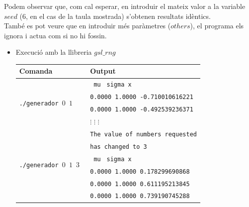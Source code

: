 \documentclass[a4paper, 11pt]{article}
\begin{document}
    Podem observar que, com cal esperar, en introduir el mateix valor a la variable $seed$ ($6$, en el cas de la taula mostrada) s'obtenen resultats idèntics.\\
    També es pot veure que en introduir més paràmetres ($others$), el programa els ignora i actua com si no hi fossin.
    \newpage
\begin{itemize}
    \item Execució amb la llibreria $gsl\_rng$
     \begin{table}[h]
            \begin{center}
            \begin{tabular}{ l | l }
            \textbf{Comanda} & \textbf{Output}\\ \hline\hline
             \multirow{4}{*}{\texttt{./generador  $0$  $1$ }} 
             &\hspace{1.5em}\texttt{    mu} \hspace{0.2em}\texttt{  sigma            }\hspace{5.9em}\texttt{x}\\ 
            & \texttt{0.0000 1.0000 -0.710010616221}\\
            & \texttt{0.0000 1.0000 -0.492539236371}\\
            & \hspace{2.5em}$\vdots$ \hspace{3em}$\vdots$ \hspace{5.5em}$\vdots$\\
            \hline
            
             \multirow{6}{*}{\texttt{./generador  $0$ $1$ $3$ }} &\texttt{The value of numbers requested}\\
             & \texttt{has changed to 3} \\
             &\hspace{1.5em}\texttt{    mu} \hspace{0.2em}\texttt{  sigma            }\hspace{5.9em}\texttt{x}\\ 
            & \texttt{0.0000 1.0000 0.178299690868}\\
            & \texttt{0.0000 1.0000 0.611195213845}\\
            & \texttt{0.0000 1.0000 0.739190745288}\\
            \hline
            

\end{tabular}
\end{center}
\end{table}
\end{itemize}
\end{document}

